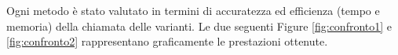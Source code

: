 \documentclass[../main.tex]{subfiles}
\begin{document}
Ogni metodo è stato valutato in termini di accuratezza ed efficienza (tempo e memoria) della chiamata delle varianti. Le due seguenti Figure \ref{fig:confronto1} e \ref{fig:confronto2} rappresentano graficamente le prestazioni ottenute.

\end{document}
